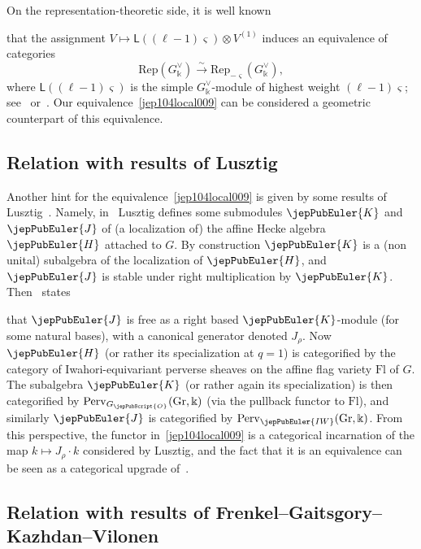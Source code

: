 On the representation-theoretic side, it is well known

that the assignment $V \mapsto \mathsf{L}((\ell-1)\varsigma) \otimes V^{(1)}$ induces an equivalence of categories
\[
 \mathrm{Rep}(G^\vee_\Bbbk) \xrightarrow{\sim} \mathrm{Rep}_{-\varsigma}(G^\vee_\Bbbk),
\]
where $\mathsf{L}((\ell-1)\varsigma)$ is the simple $G^\vee_\Bbbk$-module of highest weight $(\ell-1)\varsigma$; see~\cite[\S II.10.5]{jep104ref29} or~\cite{jep104ref07}.
Our equivalence~\eqref{jep104local009} can be considered a geometric counterpart of this equivalence.

\subsection{Relation with results of Lusztig}

Another hint for the equivalence~\eqref{jep104local009} is given by some results of Lusztig~\cite{jep104ref33}. Namely, in~\cite[\S 6]{jep104ref33} Lusztig defines some submodules $\jepPubEuler{K}$ and $\jepPubEuler{J}$ of (a localization of) the affine Hecke algebra $\jepPubEuler{H}$ attached to $G$. By construction $\jepPubEuler{K}$ is a (non unital) subalgebra of the localization of $\jepPubEuler{H}$, and $\jepPubEuler{J}$ is stable under right multiplication by $\jepPubEuler{K}$. Then~\cite[Cor.~6.8]{jep104ref33} states 

that $\jepPubEuler{J}$ is free as a right based $\jepPubEuler{K}$-module (for some natural bases), with a canonical generator denoted $J_\rho$. Now $\jepPubEuler{H}$ (or rather its specialization at $q=1$) is categorified by the category of Iwahori-equivariant perverse sheaves on the affine flag variety $\mathrm{Fl}$ of $G$. The subalgebra $\jepPubEuler{K}$ (or rather again its specialization) is then categorified by $\mathrm{Perv}_{G_{\jepPubScript{O}}}(\mathrm{Gr},\Bbbk)$ (via the pullback functor to $\mathrm{Fl}$), and similarly $\jepPubEuler{J}$ is categorified by $\mathrm{Perv}_{\jepPubEuler{IW}}(\mathrm{Gr}, \Bbbk)$. From this perspective, the functor in~\eqref{jep104local009} is a categorical incarnation of the map $k \mapsto J_\rho \cdot k$ considered by Lusztig, and the fact that it is an equivalence can be seen as a categorical upgrade of~\cite[Cor.~6.8]{jep104ref33}.

\subsection{Relation with results of Frenkel--Gaitsgory--Kazhdan--Vilonen}

